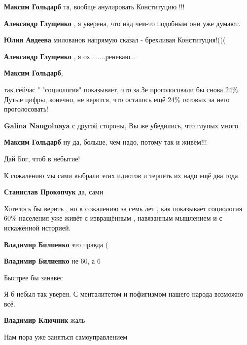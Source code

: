 \begin{itemize}
\begin{itemize} %
\textbf{Максим Гольдарб} та, вообще анулировать Конституцию !!!

\textbf{Александр Глущенко} , я уверена, что над чем-то подобным они уже думают.

\textbf{Юлия Авдеева} милованов напрямую сказал - брехливая Конституция!(((

\textbf{Александр Глущенко} , я ох........реневаю...
\end{itemize} %

\textbf{Максим Гольдарб}, 

так сейчас " "социология" показывает, что за Зе проголосовали бы снова 24\%.
Дутые цифры, конечно, не верится, что осталось ещё 24\% готовых за него
проголосовать!

\begin{itemize} %
\textbf{Galina Naugolnaya} с другой стороны, Вы же убедились, что глупых много

\textbf{Максим Гольдарб} ну да, больше, чем надо, потому так и живём!!!
\end{itemize} %

Дай Бог, чтоб в небытие!

К сожалению мы сами выбрали этих идиотов и терпеть их надо ещё два года.

\begin{itemize} %
\textbf{Станислав Прокопчук} да, сами
\end{itemize} %


Хотелось бы верить , но к сожалению за семь лет , как показывает социология 60\%
населения уже живёт с извращённым , навязанным мышлением и с искажённой
историей.

\begin{itemize} %
\textbf{Владимир Билиенко} это правда (

\textbf{Владимир Билиенко} не 60, а 6
\end{itemize} %

Быстрее бы занавес

Я б небыл так уверен. С менталитетом и пофигизмом нашего народа возможно всё.

\begin{itemize} %
\textbf{Владимир Ключник} жаль
\end{itemize} %

Нам пора уже заняться самоуправлением

\end{itemize} %
